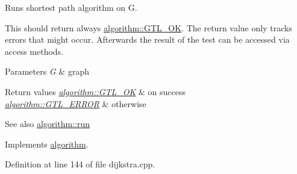 Runs shortest path algorithm on {\ttfamily G}. 

This should return always \mbox{\hyperlink{classalgorithm_af1a0078e153aa99c24f9bdf0d97f6710a5114c20e4a96a76b5de9f28bf15e282b}{algorithm\+::\+G\+T\+L\+\_\+\+OK}}. The return value only tracks errors that might occur. Afterwards the result of the test can be accessed via access methods.


\begin{DoxyParams}{Parameters}
{\em G} & graph\\
\hline
\end{DoxyParams}

\begin{DoxyRetVals}{Return values}
{\em \mbox{\hyperlink{classalgorithm_af1a0078e153aa99c24f9bdf0d97f6710a5114c20e4a96a76b5de9f28bf15e282b}{algorithm\+::\+G\+T\+L\+\_\+\+OK}}} & on success \\
\hline
{\em \mbox{\hyperlink{classalgorithm_af1a0078e153aa99c24f9bdf0d97f6710a6fcf574690bbd6cf710837a169510dd7}{algorithm\+::\+G\+T\+L\+\_\+\+E\+R\+R\+OR}}} & otherwise\\
\hline
\end{DoxyRetVals}
\begin{DoxySeeAlso}{See also}
\mbox{\hyperlink{classalgorithm_a734b189509a8d6b56b65f8ff772d43ca}{algorithm\+::run}} 
\end{DoxySeeAlso}


Implements \mbox{\hyperlink{classalgorithm_a734b189509a8d6b56b65f8ff772d43ca}{algorithm}}.



Definition at line 144 of file dijkstra.\+cpp.


